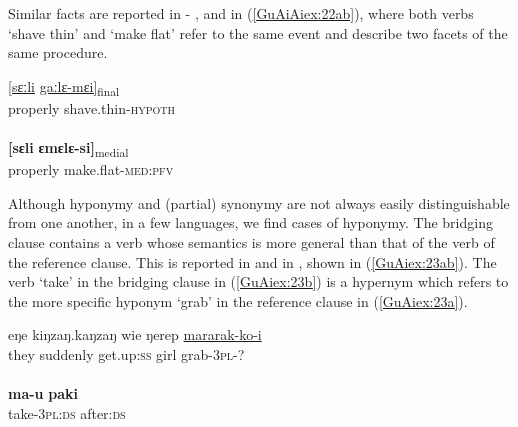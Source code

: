 \documentclass[output=paper]{LSP/langsci}
\begin{document}
Similar facts are reported in - ,  \citep{Pennington2015} and  in (\ref{GuAiAiex:22ab}), where both verbs `shave thin' and `make flat' refer to the same event and describe two facets of the same procedure. 


\begin{exe}
\ex \label{GuAiAiex:22ab}
\begin{xlist}
\ex \label{GuAiAiex:22a}
\gll \underline{[sɛːli}	\underline{gaːlɛ-mɛi]}\textsubscript{final}\\
properly	shave.thin-\textsc{hypoth}\\
\glt {}\\
\ex \label{GuAiAiex:22b}
\gll \textbf{[sɛli}	\textbf{ɛmɛlɛ-si]}\textsubscript{medial}\\
properly	make.flat-\textsc{med}:\textsc{pfv}\\
\glt {}
\end{xlist}
\end{exe}




Although hyponymy and (partial) synonymy are not always easily distinguishable from one another, in a few languages, we find cases of hyponymy. The bridging clause contains a verb whose semantics is more general than that of the verb of the reference clause. This is reported in  \citep[][151]{kleef88} and in , shown in (\ref{GuAiex:23ab}). The verb `take' in the bridging clause in (\ref{GuAiex:23b}) is a hypernym which refers to the more specific hyponym `grab' in the reference clause in (\ref{GuAiex:23a}).

\begin{exe}
\ex \label{GuAiex:23ab}
\begin{xlist}
\ex \label{GuAiex:23a}
\gll eŋe  kiŋzaŋ.kaŋzaŋ  wie     ŋerep   \underline{mararak-ko-i}\\
they  suddenly  get.up:\textsc{ss}   girl   grab-\textsc{3pl}-?\\
\glt {} \\
\ex \label{GuAiex:23b}
\gll  \textbf{ma-u}    \textbf{paki}\\
take-\textsc{3pl:ds}   after:\textsc{ds} \\
\glt {}
\end{xlist}
\end{exe}
\end{document}
